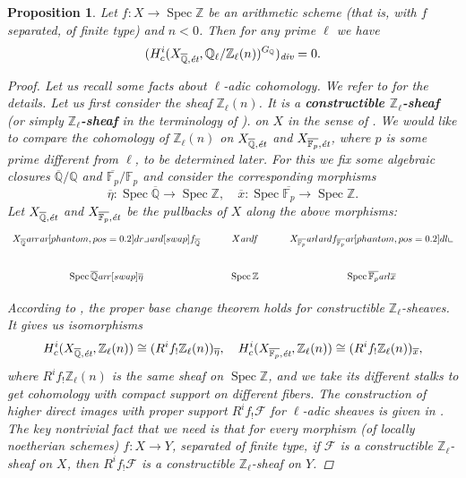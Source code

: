 \documentclass[leqno,12pt]{article}
\theoremstyle{plain}
\newtheorem{proposition}[theorem]{\indent\sc Proposition}
\theoremstyle{definition}
\DeclareMathOperator{\Spec}{Spec}
\newcommand{\ZZ}{\mathbb{Z}}
\newcommand{\QQ}{\mathbb{Q}}
\newcommand{\FF}{\mathbb{F}}
\renewcommand{\div}{\text{\it div}}
\newcommand{\ar}{\text{\it ar}}
\newcommand{\tikzpb}{\ar[phantom,pos=0.2]{dr}{\text{\large$\lrcorner$}}}
\newcommand{\tikzpbur}{\ar[phantom,pos=0.2]{dl}{\text{\large$\llcorner$}}}
\begin{document}
\begin{proposition}
  \label{prop:l-adic-cohomology-key-lemma}
  Let $f\colon X\to \Spec \ZZ$ be an arithmetic scheme (that is, with $f$
  separated, of finite type) and $n < 0$. Then for any prime $\ell$ we have
  $$(H^i_c (X_{\overline{\QQ},\text{\it \'{e}t}}, \QQ_\ell/\ZZ_\ell (n))^{G_\QQ})_\div = 0.$$

  \begin{proof}
    Let us recall some facts about $\ell$-adic cohomology. We refer to
    \cite[Expos\'{e}~VI]{SGA5} for the details. Let us first consider the sheaf
    $\ZZ_\ell (n)$. It is a
    \textbf{constructible $\ZZ_\ell$-sheaf} (or simply
      \textbf{$\ZZ_\ell$-sheaf} in the terminology of \cite[Rapport]{SGA4-1-2}).
    on $X$ in the sense of \cite[Expos\'{e}~VI, 1.1.1]{SGA5}. We would like to
    compare the cohomology of $\ZZ_\ell (n)$ on
    $X_{\overline{\QQ},\text{\it \'{e}t}}$ and $X_{\overline{\FF_p},\text{\it \'{e}t}}$,
    where $p$ is some prime different from $\ell$, to be determined later.
    For this we fix some algebraic closures $\overline{\QQ}/\QQ$ and
    $\overline{\FF_p}/\FF_p$ and consider the corresponding morphisms
    \[ \overline{\eta}\colon \Spec \overline{\QQ} \to \Spec \ZZ, \quad
    \overline{x}\colon \Spec \overline{\FF_p} \to \Spec \ZZ. \]
    Let $X_{\overline{\QQ},\text{\it \'{e}t}}$ and
    $X_{\overline{\FF_p},\text{\it \'{e}t}}$ be the pullbacks of $X$ along the above
    morphisms:
    \[ \begin{tikzcd}
      X_{\overline{\QQ}} \ar{r}\tikzpb\ar{d}[swap]{f_{\overline{\QQ}}} & X \ar{d}{f} & X_{\overline{\FF_p}} \ar{l}\ar{d}{f_{\overline{\FF_p}}}\tikzpbur \\
      \Spec \overline{\QQ} \ar{r}[swap]{\overline{\eta}} & \Spec \ZZ & \Spec \overline{\FF_p} \ar{l}{\overline{x}}
    \end{tikzcd} \]

    According to \cite[Expos\'{e}~VI, 2.2.3]{SGA5}, the proper base change theorem
    holds for constructible $\ZZ_\ell$-sheaves. It gives us isomorphisms
    \[ H^i_c (X_{\overline{\QQ}, \text{\it \'{e}t}}, \ZZ_\ell (n)) \cong (R^i f_! \ZZ_\ell (n))_{\overline{\eta}}, \quad
    H^i_c (X_{\overline{\FF_p}, \text{\it \'{e}t}}, \ZZ_\ell (n)) \cong (R^i f_! \ZZ_\ell (n))_{\overline{x}}, \]
    where $R^i f_! \ZZ_\ell (n)$ is the same sheaf on $\Spec \ZZ$, and we take
    its different stalks to get cohomology with compact support on different
    fibers. The construction of higher direct images with proper support
    $R^i f_! \mathcal{F}$ for $\ell$-adic sheaves is given in
    \cite[Expos\'{e}~VI, \S 2.2]{SGA5}. The key nontrivial fact that we need is that
    for every morphism (of locally noetherian schemes) $f\colon X\to Y$,
    separated of finite type, if $\mathcal{F}$ is a constructible
    $\ZZ_\ell$-sheaf on $X$, then $R^i f_! \mathcal{F}$ is a constructible
    $\ZZ_\ell$-sheaf on $Y$.


\end{proof}
\end{proposition}
\end{document}
